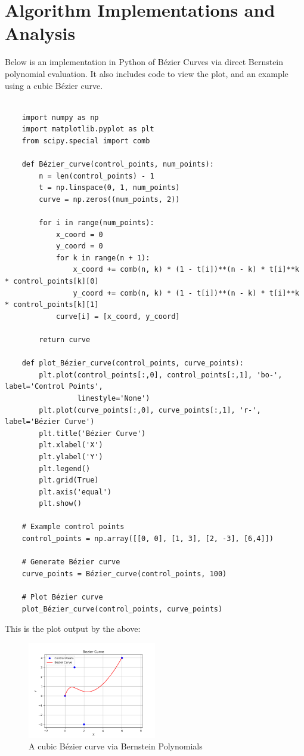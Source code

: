 \documentclass{article}
\begin{document}
\pagebreak

\section{Algorithm Implementations and Analysis}
Below is an implementation in Python of Bézier Curves via direct Bernstein polynomial evaluation. It also includes code to view the plot, and an example using a cubic Bézier curve.
\begin{verbatim}

    import numpy as np
    import matplotlib.pyplot as plt
    from scipy.special import comb

    def Bézier_curve(control_points, num_points):
        n = len(control_points) - 1
        t = np.linspace(0, 1, num_points)
        curve = np.zeros((num_points, 2))

        for i in range(num_points):
            x_coord = 0
            y_coord = 0
            for k in range(n + 1):
                x_coord += comb(n, k) * (1 - t[i])**(n - k) * t[i]**k * control_points[k][0]
                y_coord += comb(n, k) * (1 - t[i])**(n - k) * t[i]**k * control_points[k][1]
            curve[i] = [x_coord, y_coord]
    
        return curve

    def plot_Bézier_curve(control_points, curve_points):
        plt.plot(control_points[:,0], control_points[:,1], 'bo-', label='Control Points',
                 linestyle='None')
        plt.plot(curve_points[:,0], curve_points[:,1], 'r-', label='Bézier Curve')
        plt.title('Bézier Curve')
        plt.xlabel('X')
        plt.ylabel('Y')
        plt.legend()
        plt.grid(True)
        plt.axis('equal')
        plt.show()

    # Example control points
    control_points = np.array([[0, 0], [1, 3], [2, -3], [6,4]])

    # Generate Bézier curve
    curve_points = Bézier_curve(control_points, 100)

    # Plot Bézier curve
    plot_Bézier_curve(control_points, curve_points)

\end{verbatim}

This is the plot output by the above:
\begin{figure}[h]
    \centering
    \includegraphics[width=0.5\textwidth]{Cubic-Bern-Bez.png}
    \caption{A cubic Bézier curve via Bernstein Polynomials}
    \label{fig1:cubic-bez}
\end{figure}
\end{document}
